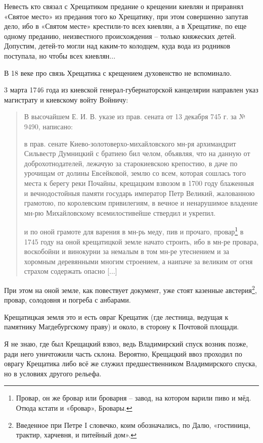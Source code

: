 Невесть кто связал с Хрещатиком предание о крещении киевлян и приравнял «Святое место» из предания того ко Хрещатику, при этом совершенно запутав дело, ибо в «Святом месте» крестили-то всех киевлян, а в Хрещатике, по еще одному преданию, неизвестного происхождения – только княжеских детей. Допустим, детей-то могли над каким-то колодцем, куда вода из родников поступала, но чтобы всех киевлян...

В 18 веке про связь Хрещатика с крещением духовенство не вспоминало. 

3 марта 1746 года из киевской генерал-губернатор\-ской канцелярии направлен указ магистрату и киевскому войту Войничу:

\begin{quotation}
В высочайшем Е. И. В. указе из прав. сената от 13 декабря 745 г. за № 9490, написано: 

в прав. сенате Киево-золотоверхо-михайлов\-ского мн-ря архимандрит Сильвестр Думницкий с братиею бил челом, объявляя, что на данную от доброхотнодателей, лежачую за старокиевскою крепостию, в даче по урочищам от долины Евсейковой, землю со всем, которая сошлась того места к берегу реки Почайны, крещацким взвозом в 1700 году блаженныя и вечнодостойныя памяти государь император Петр Великий, жалованною грамотою, по королевским привилегиям, в вечное и ненарушимое владение мн-рю Михайловскому всемилостивейше ствердил и укрепил. 

и по оной грамоте для варения в мн-рь меду, пив и прочаго, провар\footnote{Провар, он же бровар или броварня – завод, на котором варили пиво и мёд. Отюда кстати и «бровар», Бровары.} в 1745 году на оной крещатицкой земле начато строить, ибо в мн-ре провара, воскобойни и винокурни за немалым в том мн-ре утеснением и за хоромным деревянными многим строением, а наипаче за великим от огня страхом содержать опасно [...]
\end{quotation}

При этом на оной земле, как повествует документ, уже стоят казенные австерия\footnote{Введенное при Петре I словечко, коим обозначались, по Далю, «гостиница, трактир, харчевня,  и  питейный дом».}, провар, солодовня и погреба с анбарами.

Крещатицкая земля это и есть овраг Крещатик (где лестница, ведущая к памятнику Магдебургскому праву) и около, в сторону к Почтовой площади. 

Я не знаю, где был Крещацкий взвоз, ведь Владимирский спуск возник позже, ради него уничтожили часть склона. Вероятно, Крещацкий ввоз проходил по оврагу Крещатика либо всё же служил предшественником Владимирского спуска, но в условиях другого рельефа.

